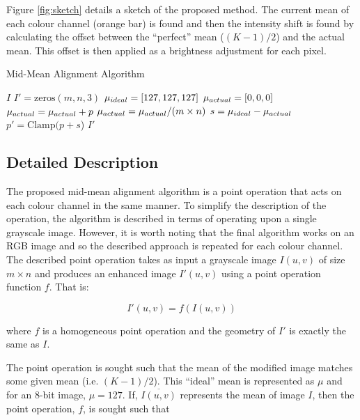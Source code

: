 \documentclass[journal,transmag]{IEEEtran}
\begin{document}
Figure \ref{fig:sketch} details a sketch of the proposed method.  The current mean of each colour channel (orange bar) is found and then the intensity shift is found by calculating the offset between the ``perfect'' mean ($(K - 1)/2$) and the actual mean.  This offset is then applied as a brightness adjustment for each pixel.

\begin{algorithm}[tp!]
\caption{Mid-Mean Alignment Algorithm}
\label{alg:mma}
\begin{algorithmic}[1]
 {$I$} 
	\State $I' = \mbox{zeros}(m, n, 3)$
	\State $\mu_{\mbox{\tiny{ideal}}} = [127, 127, 127]$
	\State $\mu_{\mbox{\tiny{actual}}} = [0, 0, 0]$
	\State 
		\State $\mu_{\mbox{\tiny{actual}}} = \mu_{\mbox{\tiny{actual}}} + p$
	\EndFor
	\State
	\State $\mu_{\mbox{\tiny{actual}}} = \mu_{\mbox{\tiny{actual}}} / (m \times n)$
	\State $s = \mu_{\mbox{\tiny{ideal}}} - \mu_{\mbox{\tiny{actual}}}$
	\State 
		\State $p' = \mbox{Clamp(}p + s$)
	\EndFor
	\State 
	\State
	\Return $I'$
\EndFunction
\end{algorithmic}
\end{algorithm}

\subsection{Detailed Description}

The proposed mid-mean alignment algorithm is a point operation that acts on each colour channel in the same manner.  To simplify the description of the operation, the algorithm is described in terms of operating upon a single grayscale image.  However, it is worth noting that the final algorithm works on an RGB image and so the described approach is repeated for each colour channel.  The described point operation takes as input a grayscale image $I(u, v)$ of size $m \times n$ and produces an enhanced image $I'(u, v)$ using a point operation function $f$.  That is:

\begin{equation}
	I'(u, v) = f(I(u, v))	
\end{equation}

\noindent where $f$ is a homogeneous point operation and the geometry of $I'$ is exactly the same as $I$.

The point operation is sought such that the mean of the modified image matches some given mean (i.e. $(K-1)/2$).  This ``ideal'' mean is represented as $\mu$ and for an $8$-bit image, $\mu = 127$.  If, $\overline{I(u, v)}$ represents the mean of image $I$, then the point operation, $f$, is sought such that
\end{document}
